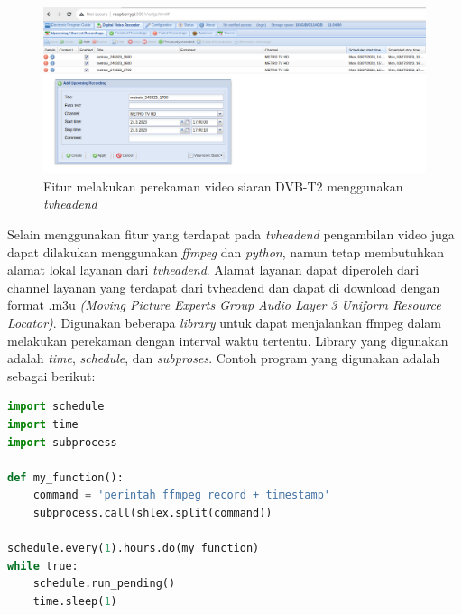 \begin{figure}[H]
	\vspace{-0.1cm}
	\begin{center}
		\includegraphics[width=1\columnwidth]{bab4/Gambar/tvheadend-record.png}
	\end{center}
	\vspace{-0.2cm}
	\caption{Fitur melakukan perekaman video siaran DVB-T2 menggunakan \textit{tvheadend}}
	\label{tvheadend-record}
\end{figure}

Selain menggunakan fitur yang terdapat pada \textit{tvheadend} pengambilan video juga dapat dilakukan menggunakan \textit{ffmpeg} dan \textit{python}, namun tetap membutuhkan alamat lokal layanan dari \textit{tvheadend}. Alamat layanan dapat diperoleh dari channel layanan yang terdapat dari tvheadend dan dapat di download dengan format .m3u\textit{ (Moving Picture Experts Group Audio Layer 3 Uniform Resource Locator)}. Digunakan beberapa \textit{library} untuk dapat menjalankan ffmpeg dalam melakukan perekaman dengan interval waktu tertentu. Library yang digunakan adalah \textit{time}, \textit{schedule}, dan \textit{subproses}. Contoh program yang digunakan adalah sebagai berikut:

\vspace{0.5cm}	
\begin{lstlisting}[basicstyle=\linespread{0.8}\selectfont, language=Python, numbers=none]
import schedule
import time
import subprocess

def my_function():
	command = 'perintah ffmpeg record + timestamp'
	subprocess.call(shlex.split(command))

schedule.every(1).hours.do(my_function)
while true:
	schedule.run_pending()
	time.sleep(1)
\end{lstlisting}

